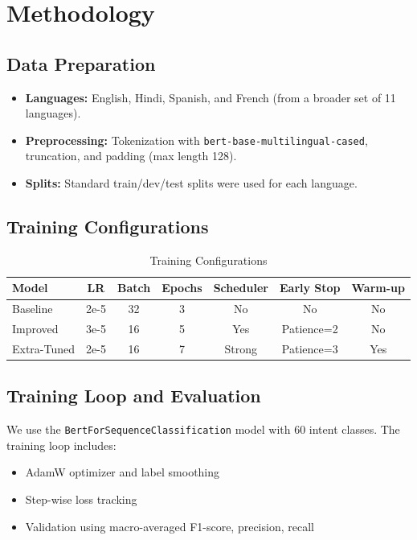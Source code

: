 \documentclass{ecai}
\begin{document}
\section{Methodology}
\subsection{Data Preparation}
\begin{itemize}
    \item \textbf{Languages:} English, Hindi, Spanish, and French (from a broader set of 11 languages).
    \item \textbf{Preprocessing:} Tokenization with \texttt{bert-base-multilingual-cased}, truncation, and padding (max length 128).
    \item \textbf{Splits:} Standard train/dev/test splits were used for each language.
\end{itemize}

\subsection{Training Configurations}
\begin{table}[H]
\centering
\caption{Training Configurations}
\begin{tabular}{lcccccc}
\toprule
Model & LR & Batch & Epochs & Scheduler & Early Stop & Warm-up \\
\midrule
Baseline & 2e-5 & 32 & 3 & No & No & No \\
Improved & 3e-5 & 16 & 5 & Yes & Patience=2 & No \\
Extra-Tuned & 2e-5 & 16 & 7 & Strong & Patience=3 & Yes \\
\bottomrule
\end{tabular}
\end{table}

\subsection{Training Loop and Evaluation}
We use the \texttt{BertForSequenceClassification} model with 60 intent classes. The training loop includes:
\begin{itemize}
    \item AdamW optimizer and label smoothing
    \item Step-wise loss tracking
    \item Validation using macro-averaged F1-score, precision, recall
\end{itemize}
\end{document}
